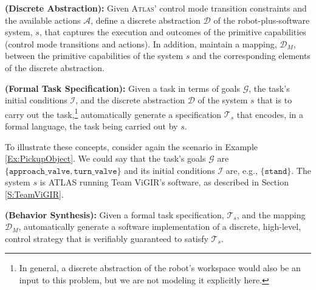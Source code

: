 
\begin{myProblem}\label{DiscreteAbstractionProblem}
\textbf{(Discrete Abstraction):}
Given \textsc{Atlas}' control mode transition constraints and the available actions $\mathcal{A}$, define a discrete abstraction $\mathcal{D}$ of the robot-plus-software system, $s$, that captures the execution and outcomes of the primitive capabilities (control mode transitions and actions).
In addition, maintain a mapping, $\mathcal{D}_M$, between the primitive capabilities of the system $s$ and the corresponding elements of the discrete abstraction.
\end{myProblem}

\begin{myProblem}\label{SpecificationProblem}
\textbf{(Formal Task Specification):}
Given a task in terms of goals $\mathcal{G}$, the task's initial conditions $\mathcal{I}$, and the discrete abstraction $\mathcal{D}$ of the system $s$ that is to carry out the task,\footnote{In general, a discrete abstraction of the robot's workspace would also be an input to this problem, but we are not modeling it explicitly here.}
 automatically generate a specification $\mathcal{T}_s$ that encodes, in a formal language, the task being carried out by $s$.
\end{myProblem}

To illustrate these concepts, consider again the scenario in Example \ref{Ex:PickupObject}. 
We could say that the task's goals $\mathcal{G}$ are $\{ \mathtt{approach\_valve}, \mathtt{turn\_valve} \}$ and its initial conditions $\mathcal{I}$ are, e.g., $\{ \mathtt{stand} \}$.
The system $s$ is ATLAS running Team ViGIR's software, as described in Section \ref{S:TeamViGIR}.

\begin{myProblem}\label{BehaviorSynthesisProblem}
\textbf{(Behavior Synthesis):}
Given a formal task specification, $\mathcal{T}_s$, and the mapping $\mathcal{D}_M$, automatically generate a software implementation of a discrete, high-level, control strategy that is verifiably guaranteed to satisfy $\mathcal{T}_s$.
\end{myProblem}

